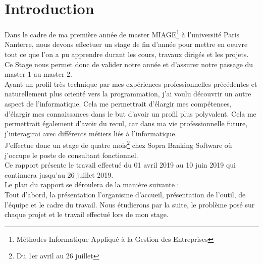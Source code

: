 \section{Introduction}
Dans le cadre de ma première année de master MIAGE\footnote{Méthodes Informatique Appliqué à la Gestion des Entreprises} à l'université Paris Nanterre, nous devons effectuer un stage de fin d'année pour mettre en oeuvre tout ce que l'on a pu apprendre durant les cours, travaux dirigés et les projets. Ce Stage nous permet donc de valider notre année et d'assurer notre passage du master 1 au master 2.\\

Ayant un profil très technique par mes expériences professionnelles précédentes et naturellement plus orienté vers la programmation, j'ai voulu découvrir un autre aspect de l'informatique. Cela me permettrait d'élargir mes compétences, d'élargir mes connaissances dans le but d'avoir un profil plus polyvalent. Cela me permettrait également d'avoir du recul, car dans ma vie professionnelle future, j'interagirai avec différents métiers liés à l'informatique.\\

J'effectue donc un stage de quatre mois\footnote{Du 1er avril au 26 juillet} chez Sopra Banking Software où j'occupe le poste de consultant fonctionnel.\\

Ce rapport présente le travail effectué du 01 avril 2019 au 10 juin 2019 qui continuera jusqu'au 26 juillet 2019.\\

{Le plan du rapport se déroulera de la manière suivante :}\\
Tout d'abord, la présentation l'organisme d'accueil, présentation de l'outil, de l'équipe et le cadre du travail. Nous étudierons par la suite, le problème posé sur chaque projet et le travail effectué lors de mon stage.